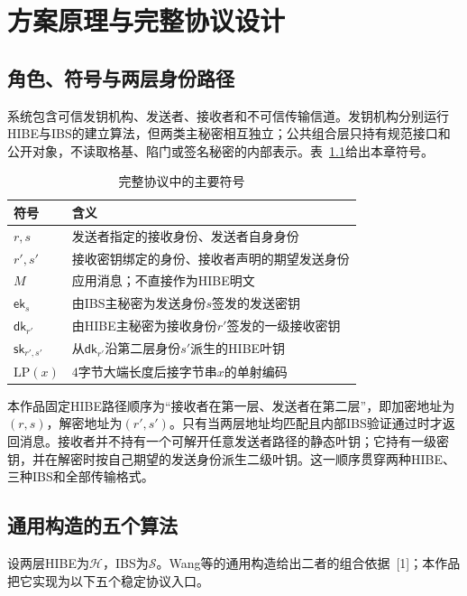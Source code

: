 \documentclass[UTF8,a4paper,12pt,oneside,openany,fontset=fandol]{ctexrep}
\begin{document}
\chapter{方案原理与完整协议设计}

\section{角色、符号与两层身份路径}
系统包含可信发钥机构、发送者、接收者和不可信传输信道。发钥机构分别运行HIBE与IBS的建立算法，但两类主秘密相互独立；公共组合层只持有规范接口和公开对象，不读取格基、陷门或签名秘密的内部表示。表~\ref{tab:protocol-symbols}给出本章符号。

\begin{table}[htbp]
\centering
\small
\caption{完整协议中的主要符号}
\label{tab:protocol-symbols}
\begin{tabularx}{\textwidth}{@{}>{\centering\arraybackslash}p{}>{\raggedright\arraybackslash}X@{}}
\toprule
\rowcolor{black!8} 符号 & 含义 \\
\midrule
\(r,s\) & 发送者指定的接收身份、发送者自身身份 \\
\(r',s'\) & 接收密钥绑定的身份、接收者声明的期望发送身份 \\
\(M\) & 应用消息；不直接作为HIBE明文 \\
\(\mathsf{ek}_s\) & 由IBS主秘密为发送身份\(s\)签发的发送密钥 \\
\(\mathsf{dk}_{r'}\) & 由HIBE主秘密为接收身份\(r'\)签发的一级接收密钥 \\
\(\mathsf{sk}_{r',s'}\) & 从\(\mathsf{dk}_{r'}\)沿第二层身份\(s'\)派生的HIBE叶钥 \\
\(\mathrm{LP}(x)\) & \(4\)字节大端长度后接字节串\(x\)的单射编码 \\
\bottomrule
\end{tabularx}
\end{table}

本作品固定HIBE路径顺序为“接收者在第一层、发送者在第二层”，即加密地址为\((r,s)\)，解密地址为\((r',s')\)。只有当两层地址均匹配且内部IBS验证通过时才返回消息。接收者并不持有一个可解开任意发送者路径的静态叶钥；它持有一级密钥，并在解密时按自己期望的发送身份派生二级叶钥。这一顺序贯穿两种HIBE、三种IBS和全部传输格式。

\section{通用构造的五个算法}
设两层HIBE为\(\mathcal H\)，IBS为\(\mathcal S\)。Wang等的通用构造给出二者的组合依据~[1]；本作品把它实现为以下五个稳定协议入口。
\end{document}

